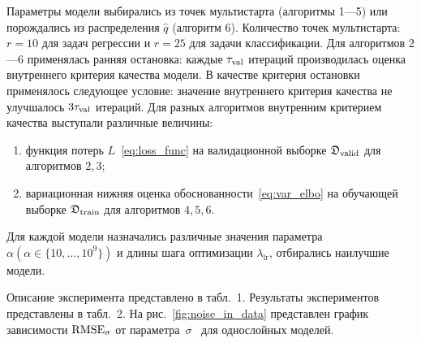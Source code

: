 Параметры модели выбирались из точек мультистарта (алгоритмы 1---5) или порождались из распределения $\hat{q}$ (алгоритм 6). Количество точек мультистарта: $r=10$ {для задач регрессии и $r=25$ для задачи классификации}.
Для алгоритмов 2---6 применялась ранняя остановка: каждые $\tau_\textnormal{val}$ итераций производилась оценка внутреннего критерия качества модели. В качестве критерия остановки применялось следующее условие: значение внутреннего критерия качества не улучшалось $3\tau_\textnormal{val}$ итераций. Для разных алгоритмов внутренним критерием качества выступали различные величины:
\begin{enumerate}[1)]
\item функция потерь $L$~\eqref{eq:loss_func} на валидационной выборке $\mathfrak{D}_\textnormal{valid}$ для алгоритмов $2,3$;
\item вариационная нижняя оценка обоснованности~\eqref{eq:var_elbo} на обучающей выборке $\mathfrak{D}_\textnormal{train}$ для алгоритмов $4,5,6$.
\end{enumerate}

Для каждой модели назначались различные значения параметра $\alpha (\alpha \in \{10, \dots, 10^9\})$ и длины шага оптимизации $\lambda_{\text{lr}}$, отбирались наилучшие модели. 



Описание эксперимента представлено в табл.~1. Результаты экспериментов представлены в табл.~2. На рис.~\ref{fig:noise_in_data} представлен график зависимости $\textnormal{RMSE}_{\sigma}$ от параметра~$\sigma$~{ для однослойных моделей}. 

